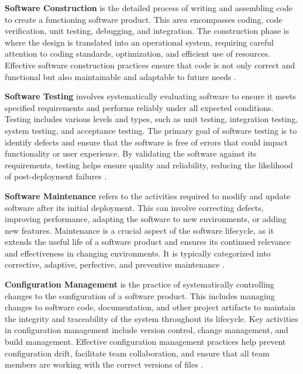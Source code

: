 \begin{refsection}
\textbf{Software Construction} is the detailed process of writing and assembling code to create a functioning software product. This area encompasses coding, code verification, unit testing, debugging, and integration. The construction phase is where the design is translated into an operational system, requiring careful attention to coding standards, optimization, and efficient use of resources. Effective software construction practices ensure that code is not only correct and functional but also maintainable and adaptable to future needs \cite[pp.~295-299]{mcconnell2007code}.

\textbf{Software Testing} involves systematically evaluating software to ensure it meets specified requirements and performs reliably under all expected conditions. Testing includes various levels and types, such as unit testing, integration testing, system testing, and acceptance testing. The primary goal of software testing is to identify defects and ensure that the software is free of errors that could impact functionality or user experience. By validating the software against its requirements, testing helps ensure quality and reliability, reducing the likelihood of post-deployment failures \cite[pp.~356-360]{myers2015art}.

\textbf{Software Maintenance} refers to the activities required to modify and update software after its initial deployment. This can involve correcting defects, improving performance, adapting the software to new environments, or adding new features. Maintenance is a crucial aspect of the software lifecycle, as it extends the useful life of a software product and ensures its continued relevance and effectiveness in changing environments. It is typically categorized into corrective, adaptive, perfective, and preventive maintenance \cite[pp.~509-512]{sommerville2016software}.

\textbf{Configuration Management} is the practice of systematically controlling changes to the configuration of a software product. This includes managing changes to software code, documentation, and other project artifacts to maintain the integrity and traceability of the system throughout its lifecycle. Key activities in configuration management include version control, change management, and build management. Effective configuration management practices help prevent configuration drift, facilitate team collaboration, and ensure that all team members are working with the correct versions of files \cite[pp.~267-270]{hunt2005pragmatic}.


\end{refsection}
